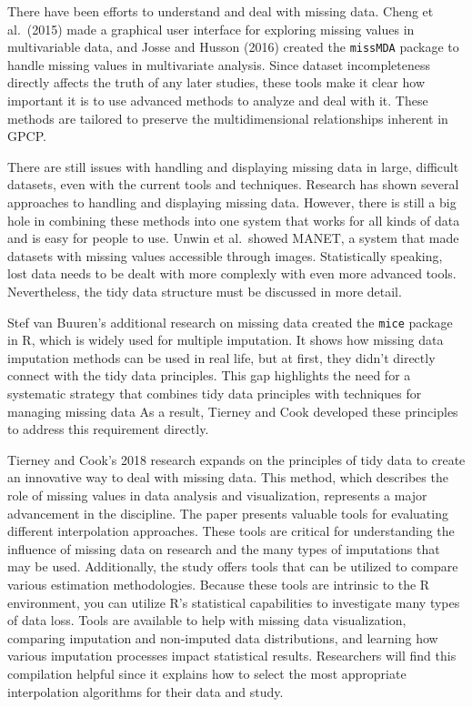 \documentclass[print]{nuthesis}
\begin{document}
There have been efforts to understand and deal with missing data.
Cheng et al.~(2015) made a graphical user interface for exploring missing values in multivariable data, and Josse and Husson (2016) created the \texttt{missMDA} package to handle missing values in multivariate analysis.
Since dataset incompleteness directly affects the truth of any later studies, these tools make it clear how important it is to use advanced methods to analyze and deal with it.
These methods are tailored to preserve the multidimensional relationships inherent in GPCP.

There are still issues with handling and displaying missing data in large, difficult datasets, even with the current tools and techniques.
Research has shown several approaches to handling and displaying missing data.
However, there is still a big hole in combining these methods into one system that works for all kinds of data and is easy for people to use.
Unwin et al.~showed MANET, a system that made datasets with missing values accessible through images.
Statistically speaking, lost data needs to be dealt with more complexly with even more advanced tools.
Nevertheless, the tidy data structure must be discussed in more detail.

Stef van Buuren's additional research on missing data created the \texttt{mice} package in R, which is widely used for multiple imputation.
It shows how missing data imputation methods can be used in real life, but at first, they didn't directly connect with the tidy data principles.
This gap highlights the need for a systematic strategy that combines tidy data principles with techniques for managing missing data
As a result, Tierney and Cook developed these principles to address this requirement directly.

Tierney and Cook's 2018 research expands on the principles of tidy data to create an innovative way to deal with missing data.
This method, which describes the role of missing values in data analysis and visualization, represents a major advancement in the discipline.
The paper presents valuable tools for evaluating different interpolation approaches.
These tools are critical for understanding the influence of missing data on research and the many types of imputations that may be used.
Additionally, the study offers tools that can be utilized to compare various estimation methodologies.
Because these tools are intrinsic to the R environment, you can utilize R's statistical capabilities to investigate many types of data loss.
Tools are available to help with missing data visualization, comparing imputation and non-imputed data distributions, and learning how various imputation processes impact statistical results.
Researchers will find this compilation helpful since it explains how to select the most appropriate interpolation algorithms for their data and study.
\end{document}
